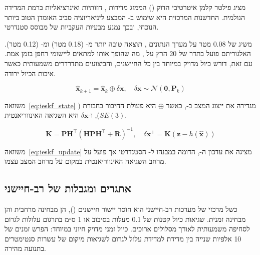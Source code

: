  מציג פילטר קלמן איטרטיבי הדוק
() הממזג מדידות ,
חזותיות ואינרציאליות ברמת המדידה הגולמית. החדשנות המרכזית היא
שימוש ב- המבצע ליניאריזציה סביב האומדן הטוב ביותר
הנוכחי, ובכך נמנע מבעיות העקביות של  מבוסס
 סטנדרטי.

 משיג  של 0.08 מטר על מערך הנתונים
, תוצאה טובה יותר מ- (0.18 מטר)
ומ- (0.12 מטר). האלגוריתם פועל בתדר של 20 הרץ
על , מה שהופך אותו למתאים
ליישומי רחפן בזמן אמת. עם זאת,  דורש כיול מדויק
במיוחד בין כל החיישנים, והביצועים מתדרדרים משמעותית כאשר
איכות הכיול ירודה.

\begin{equation}
    \hat{\mathbf{x}}_{k+1} = \hat{\mathbf{x}}_k \oplus \delta\mathbf{x},
    \quad \delta\mathbf{x} \sim \mathcal{N}(\mathbf{0}, \mathbf{P}_k)
    \label{eq:ieskf_state}
\end{equation}

משוואה~\ref{eq:ieskf_state} מגדירה את ייצוג המצב ב-,
כאשר $\oplus$ היא פעולת החיבור בחבורת  ($SE(3)$),
ו-$\delta\mathbf{x}$ היא השגיאה האינווריאנטית.

\begin{equation}
    \mathbf{K} = \mathbf{P} \mathbf{H}^\top (\mathbf{H} \mathbf{P} \mathbf{H}^\top + \mathbf{R})^{-1},
    \quad \delta\mathbf{x}^+ = \mathbf{K} (\mathbf{z} - h(\hat{\mathbf{x}}))
    \label{eq:ieskf_update}
\end{equation}

משוואה~\ref{eq:ieskf_update} מציגה את עדכון ה-,
הדומה במבנהו ל- הסטנדרטי אך פועל על מרחב השגיאה
האינווריאנטית במקום על מרחב המצב עצמו.

\subsection{אתגרים ומגבלות של  רב-חיישני}
\label{subsec:fusion_challenges}

כשל מרכזי של מערכות  רב-חיישני הוא חוסר יישור חיישנים
(), הן מבחינה מרחבית והן מבחינה זמנית.
שגיאות כיול קטנות של 0.1 מעלות בסיבוב או 1 ס״מ בתרגום עלולות
לגרום לסחיפה משמעותית לאורך מסלולים ארוכים. כיול זמני מדויק
חיוני במיוחד: הפרש זמנים של 10 אלפיות שנייה בין מדידת 
למדידת  עלול לגרום לשגיאות מיקום של עשרות סנטימטרים
בתנועה מהירה.

